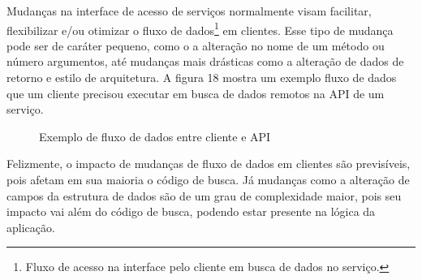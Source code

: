 Mudanças na interface de acesso de serviços normalmente visam facilitar, flexibilizar e/ou otimizar o fluxo de dados\footnote{
  Fluxo de acesso na interface pelo cliente em busca de dados no serviço.
} em clientes. Esse tipo de mudança pode ser de caráter pequeno, como o a alteração no nome de um método ou número argumentos, até mudanças mais drásticas como a alteração de dados de retorno e estilo de arquitetura. A figura 18 mostra um exemplo fluxo de dados que um cliente precisou executar em busca de dados remotos na API de um serviço.

\begin{figure}[H]
  \centering
  \caption{Exemplo de fluxo de dados entre cliente e API}
\end{figure}

Felizmente, o impacto de mudanças de fluxo de dados em clientes são previsíveis, pois afetam em sua maioria o código de busca. Já mudanças como a alteração de campos da estrutura de dados são de um grau de complexidade maior, pois seu impacto vai além do código de busca, podendo estar presente na lógica da aplicação.

